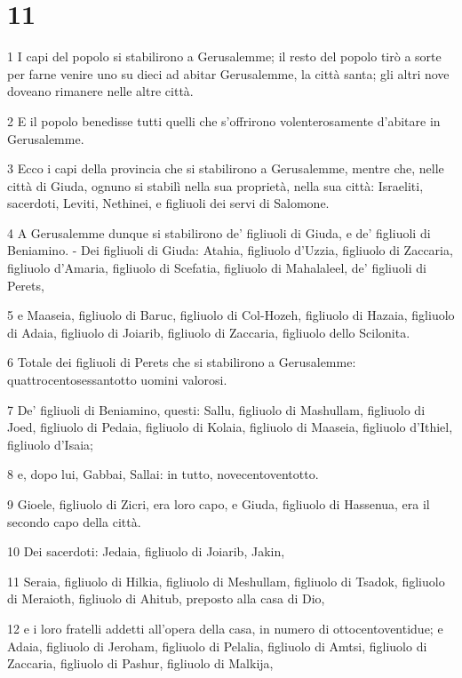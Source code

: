 \chapter{11}

\par 1 I capi del popolo si stabilirono a Gerusalemme; il resto del popolo tirò a sorte per farne venire uno su dieci ad abitar Gerusalemme, la città santa; gli altri nove doveano rimanere nelle altre città.
\par 2 E il popolo benedisse tutti quelli che s'offrirono volenterosamente d'abitare in Gerusalemme.
\par 3 Ecco i capi della provincia che si stabilirono a Gerusalemme, mentre che, nelle città di Giuda, ognuno si stabilì nella sua proprietà, nella sua città: Israeliti, sacerdoti, Leviti, Nethinei, e figliuoli dei servi di Salomone.
\par 4 A Gerusalemme dunque si stabilirono de' figliuoli di Giuda, e de' figliuoli di Beniamino. - Dei figliuoli di Giuda: Atahia, figliuolo d'Uzzia, figliuolo di Zaccaria, figliuolo d'Amaria, figliuolo di Scefatia, figliuolo di Mahalaleel, de' figliuoli di Perets,
\par 5 e Maaseia, figliuolo di Baruc, figliuolo di Col-Hozeh, figliuolo di Hazaia, figliuolo di Adaia, figliuolo di Joiarib, figliuolo di Zaccaria, figliuolo dello Scilonita.
\par 6 Totale dei figliuoli di Perets che si stabilirono a Gerusalemme: quattrocentosessantotto uomini valorosi.
\par 7 De' figliuoli di Beniamino, questi: Sallu, figliuolo di Mashullam, figliuolo di Joed, figliuolo di Pedaia, figliuolo di Kolaia, figliuolo di Maaseia, figliuolo d'Ithiel, figliuolo d'Isaia;
\par 8 e, dopo lui, Gabbai, Sallai: in tutto, novecentoventotto.
\par 9 Gioele, figliuolo di Zicri, era loro capo, e Giuda, figliuolo di Hassenua, era il secondo capo della città.
\par 10 Dei sacerdoti: Jedaia, figliuolo di Joiarib, Jakin,
\par 11 Seraia, figliuolo di Hilkia, figliuolo di Meshullam, figliuolo di Tsadok, figliuolo di Meraioth, figliuolo di Ahitub, preposto alla casa di Dio,
\par 12 e i loro fratelli addetti all'opera della casa, in numero di ottocentoventidue; e Adaia, figliuolo di Jeroham, figliuolo di Pelalia, figliuolo di Amtsi, figliuolo di Zaccaria, figliuolo di Pashur, figliuolo di Malkija,
